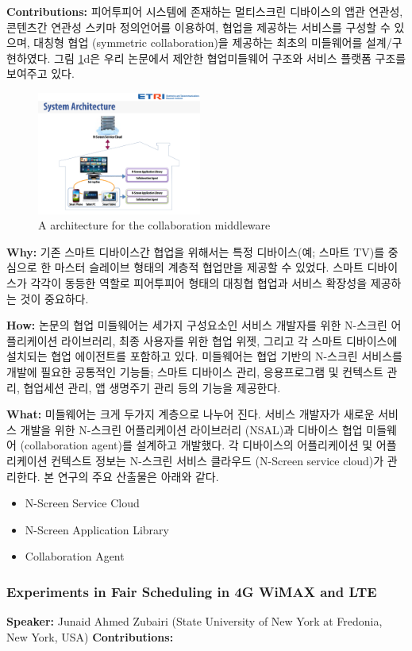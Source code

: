 \documentclass[twocolumn]{article}
\newcommand{\bi}{\begin{itemize}}
\newcommand{\ei}{\end{itemize}}
\newcommand{\ii}{\item}
\begin{document}
\noindent
\textbf{Contributions:} 피어투피어 시스템에 존재하는 멀티스크린 디바이스의 앱관 연관성, 콘텐츠간 연관성 스키마 정의언어를 이용하여, 협업을 제공하는 서비스를 구성할 수 있으며, 대칭형 협업 (symmetric collaboration)을 제공하는 최초의 미들웨어를 설계/구현하였다. 그림 \ref{fig:middleware-architecture}d은 우리 논문에서 제안한 협업미들웨어 구조와 서비스 플랫폼 구조를 보여주고 있다.

\begin{figure}[htb]
        \centering
        \includegraphics[width=0.48\textwidth]{middleware.pdf}
        \caption{A architecture for the collaboration middleware}
        \label{fig:middleware-architecture}
\end{figure}

\noindent
\textbf{Why:} 기존 스마트 디바이스간 협업을 위해서는 특정 디바이스(예; 스마트 TV)를 중심으로 한 마스터 슬레이브 형태의 계층적 협업만을 제공할 수 있었다. 스마트 디바이스가 각각이 동등한 역할로 피어투피어 형태의 대칭협 협업과 서비스 확장성을 제공하는 것이 중요하다. 

\noindent
\textbf{How:}  논문의 협업 미들웨어는 세가지 구성요소인 서비스 개발자를 위한 N-스크린 어플리케이션 라이브러리, 최종 사용자를 위한 협업 위젯, 그리고 각 스마트 디바이스에 설치되는 협업 에이전트를 포함하고 있다. 미들웨어는 협업 기반의 N-스크린 서비스를 개발에 필요한 공통적인 기능들; 스마트 디바이스 관리, 응용프로그램 및 컨텍스트 관리, 협업세션 관리, 앱 생명주기 관리 등의 기능을 제공한다.

\noindent
\textbf{What:} 미들웨어는 크게 두가지 계층으로 나누어 진다. 서비스 개발자가 새로운 서비스 개발을 위한 N-스크린 어플리케이션 라이브러리 (NSAL)과 디바이스 협업 미들웨어 (collaboration agent)를 설계하고 개발했다. 각 디바이스의 어플리케이션 및 어플리케이션 컨텍스트 정보는 N-스크린 서비스 클라우드 (N-Screen service cloud)가 관리한다. 본 연구의 주요 산출물은 아래와 같다.
\bi
\ii N-Screen Service Cloud
\ii N-Screen Application Library
\ii Collaboration Agent
\ei

\subsubsection{Experiments in Fair Scheduling in 4G WiMAX and LTE}
\textbf{Speaker:} Junaid Ahmed Zubairi (State University of New York at Fredonia, New York, USA)
\noindent
\textbf{Contributions:}  
\end{document}
